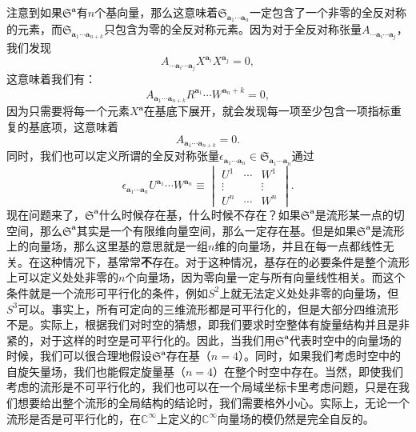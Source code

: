 注意到如果$\mathfrak{S}^{\boldsymbol{a}}$有$n$个基向量，那么这意味着$\mathfrak{S}_{\boldsymbol{a}_{1} \cdots \boldsymbol{a}_{n}}$一定包含了一个非零的全反对称的元素，而$\mathfrak{S}_{\boldsymbol{a}_{1} \cdots \boldsymbol{a}_{n+k}}$只包含为零的全反对称元素。因为对于全反对称张量$A_{\cdots \boldsymbol{a}_{i} \cdots \boldsymbol{a}_{j}}$，我们发现
\begin{equation*}
	A_{\cdots \boldsymbol{a}_{i} \cdots \boldsymbol{a}_{j}} X^{\boldsymbol{a}_{i}} X^{\boldsymbol{a}_{j}} =0,
\end{equation*}
这意味着我们有：
\begin{equation*}
	A_{\boldsymbol{a}_{1} \cdots \boldsymbol{a}_{n+k}} R^{\boldsymbol{a}_{1}} \cdots W^{\boldsymbol{a}_{n} +k} =0,
\end{equation*}
因为只需要将每一个元素$X^{\boldsymbol{a}}$在基底下展开，就会发现每一项至少包含一项指标重复的基底项，这意味着
\begin{equation*}
	A_{\boldsymbol{a}_{1} \cdots \boldsymbol{a}_{n+k}} =0.
\end{equation*}
同时，我们也可以定义所谓的全反对称张量$\epsilon _{\boldsymbol{a}_{1} \cdots \boldsymbol{a}_{n}} \in \mathfrak{S}_{\boldsymbol{a}_{1} \cdots \boldsymbol{a}_{n}}$通过
\begin{equation*}
	\epsilon _{\boldsymbol{a}_{1} \cdots \boldsymbol{a}_{n}} U^{\boldsymbol{a}_{1}} \cdots W^{\boldsymbol{a}_{n}} \equiv \begin{vmatrix}
		U^{1} & \cdots  & W^{1}\\
		\vdots  &  & \vdots \\
		U^{n} & \cdots  & W^{n}
	\end{vmatrix} .
\end{equation*}
现在问题来了，$\mathfrak{S}^{\boldsymbol{a}}$什么时候存在基，什么时候不存在？如果$\mathfrak{S}^{\boldsymbol{a}}$是流形某一点的切空间，那么$\mathfrak{S}^{\boldsymbol{a}}$其实是一个有限维向量空间，那么一定存在基。但是如果$\mathfrak{S}^{\boldsymbol{a}}$是流形上的向量场，那么这里基的意思就是一组$n$维的向量场，并且在每一点都线性无关。在这种情况下，基常常\textbf{不}存在。对于这种情况，基存在的必要条件是整个流形上可以定义处处非零的$n$个向量场，因为零向量一定与所有向量线性相关。而这个条件就是一个流形可平行化的条件，例如$S^{2}$上就无法定义处处非零的向量场，但$S^{3}$可以。事实上，所有可定向的三维流形都是可平行化的，但是大部分四维流形不是。实际上，根据我们对时空的猜想，即我们要求时空整体有旋量结构并且是非紧的，对于这样的时空是可平行化的。因此，当我们用$\mathfrak{S}^{\boldsymbol{a}}$代表时空中的向量场的时候，我们可以很合理地假设$\mathfrak{S}^{\boldsymbol{a}}$存在基（$n=4$）。同时，如果我们考虑时空中的自旋矢量场，我们也能假定旋量基（$n=4$）在整个时空中存在。当然，即使我们考虑的流形是不可平行化的，我们也可以在一个局域坐标卡里考虑问题，只是在我们想要给出整个流形的全局结构的结论时，我们需要格外小心。实际上，无论一个流形是否是可平行化的，在$\mathbb{C}^{\infty }$上定义的$\mathbb{C}^{\infty }$向量场的模仍然是完全自反的。



